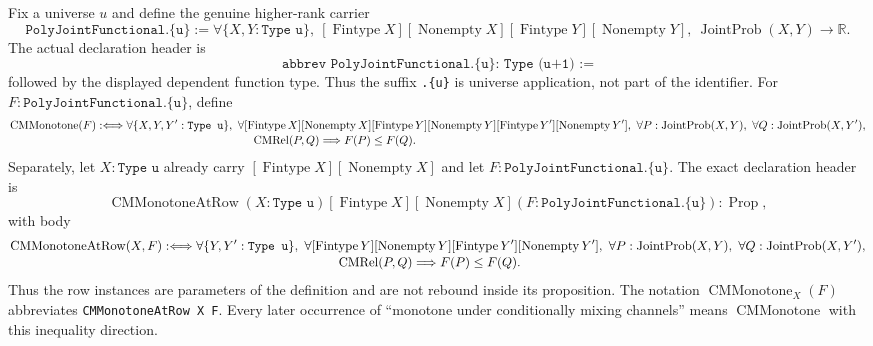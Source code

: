 \documentclass[9pt]{extarticle}
\theoremstyle{definition}
\theoremstyle{remark}
\newcommand{\R}{\mathbb R}
\begin{document}
Fix a universe $u$ and define the genuine higher-rank carrier
\begin{equation}
 \texttt{PolyJointFunctional.\{u\}}:=
 \forall\{X,Y:\texttt{Type u}\},\
 [\operatorname{Fintype}X][\operatorname{Nonempty}X]
 [\operatorname{Fintype}Y][\operatorname{Nonempty}Y],\
 \operatorname{JointProb}(X,Y)\to\R.
 \label{eq:poly-joint-functional}
\end{equation}
The actual declaration header is
\[
 \texttt{abbrev PolyJointFunctional.\{u\} : Type (u+1) :=}
\]
followed by the displayed dependent function type.  Thus the suffix
\texttt{.\{u\}} is universe application, not part of the identifier.
For $F:\texttt{PolyJointFunctional.\{u\}}$, define
\begin{align*}
 \operatorname{CMMonotone}(F)
 &: \Longleftrightarrow
 \forall\{X,Y,Y':\texttt{Type u}\},\
 \forall[\operatorname{Fintype}X][\operatorname{Nonempty}X]
 [\operatorname{Fintype}Y][\operatorname{Nonempty}Y]
 [\operatorname{Fintype}Y'][\operatorname{Nonempty}Y'],\
 \forall P:\operatorname{JointProb}(X,Y),\
 \forall Q:\operatorname{JointProb}(X,Y'),\\[-2pt]
 &\hspace{48mm}\operatorname{CMRel}(P,Q)\Longrightarrow F(P)\leq F(Q).
\end{align*}
Separately, let $X:\texttt{Type u}$ already carry
$[\operatorname{Fintype}X][\operatorname{Nonempty}X]$ and let
$F:\texttt{PolyJointFunctional.\{u\}}$.  The exact declaration header is
\[
 \operatorname{CMMonotoneAtRow}
 (X:\texttt{Type u})[\operatorname{Fintype}X]
 [\operatorname{Nonempty}X](F:\texttt{PolyJointFunctional.\{u\}}):
 \operatorname{Prop},
\]
with body
\begin{align*}
 \operatorname{CMMonotoneAtRow}(X,F)
 &: \Longleftrightarrow
 \forall\{Y,Y':\texttt{Type u}\},\
 \forall[\operatorname{Fintype}Y][\operatorname{Nonempty}Y]
 [\operatorname{Fintype}Y'][\operatorname{Nonempty}Y'],\
 \forall P:\operatorname{JointProb}(X,Y),\
 \forall Q:\operatorname{JointProb}(X,Y'),\\[-2pt]
 &\hspace{48mm}\operatorname{CMRel}(P,Q)\Longrightarrow F(P)\leq F(Q).
\end{align*}
Thus the row instances are parameters of the definition and are not rebound
inside its proposition.  The notation
$\operatorname{CMMonotone}_X(F)$ abbreviates
\texttt{CMMonotoneAtRow X F}.  Every later
occurrence of ``monotone under conditionally mixing channels'' means
$\operatorname{CMMonotone}$ with this inequality direction.
\end{document}
